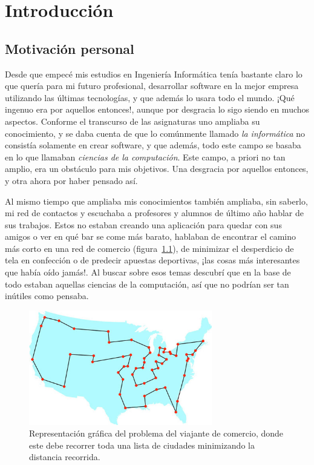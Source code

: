 \chapter{Introducción} \label{chap:1}

\vspace*{5mm}

\section{Motivación personal} \label{sec:1.1}

Desde que empecé mis estudios en Ingeniería Informática tenía bastante claro lo que quería para mi futuro profesional, desarrollar software en la mejor empresa utilizando las últimas tecnologías, y que además lo usara todo el mundo. ¡Qué ingenuo era por aquellos entonces!, aunque por desgracia lo sigo siendo en muchos aspectos. Conforme el transcurso de las asignaturas uno ampliaba su conocimiento, y se daba cuenta de que lo comúnmente llamado \emph{la informática} no consistía solamente en crear software, y que además, todo este campo se basaba en lo que llamaban \emph{ciencias de la computación}. Este campo, a priori no tan amplio, era un obstáculo para mis objetivos. Una desgracia por aquellos entonces, y otra ahora por haber pensado así.

Al mismo tiempo que ampliaba mis conocimientos también ampliaba, sin saberlo, mi red de contactos y escuchaba a profesores y alumnos de último año hablar de sus trabajos. Estos no estaban creando una aplicación para quedar con sus amigos o ver en qué bar se come más barato, hablaban de encontrar el camino más corto en una red de comercio (figura~\ref{fig:1.1}), de minimizar el desperdicio de tela en confección o de predecir apuestas deportivas, ¡las cosas más interesantes que había oído jamás!. Al buscar sobre esos temas descubrí que en la base de todo estaban aquellas ciencias de la computación, así que no podrían ser tan inútiles como pensaba.

\begin{figure}[ht]
    \centering
    \includegraphics[width=80mm]{figures/ch_01/tsp.jpg}
    \caption{Representación gráfica del problema del viajante de comercio, donde este debe recorrer toda una lista de ciudades minimizando la distancia recorrida. \cite{isherwood2012life}}
    \label{fig:1.1}
\end{figure}


